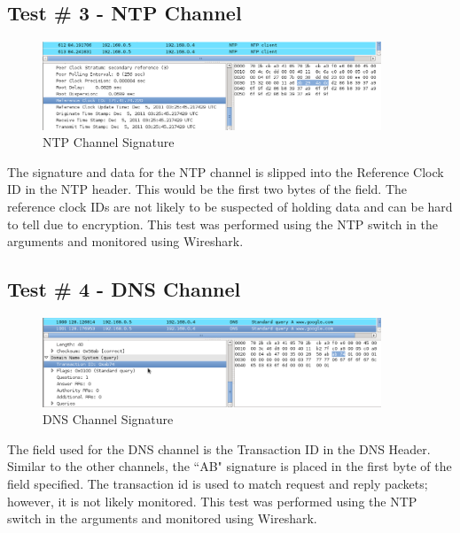 \documentclass[titlepage]{article}
\begin{document}
\clearpage

\subsection{Test \# 3 - NTP Channel}

\begin{figure}[htb]                                                                       
  \begin{center}
    \includegraphics[width=0.9\textwidth]{Pictures/NTP_SIG.png}
  \end{center}
  \caption{NTP Channel Signature}
  \label{fig:ntp_sig}
\end{figure}

The signature and data for the NTP channel is slipped into the Reference Clock ID in the NTP header.
This would be the first two bytes of the field.  The reference clock IDs are not likely to be
suspected of holding data and can be hard to tell due to encryption.
This test was performed using the NTP switch in the arguments and monitored using Wireshark.

\subsection{Test \# 4 - DNS Channel}

\begin{figure}[htb]                                                                       
  \begin{center}
    \includegraphics[width=0.9\textwidth]{Pictures/DNS_SIG.png}
  \end{center}
  \caption{DNS Channel Signature}
  \label{fig:dns_sig}
\end{figure}

The field used for the DNS channel is the Transaction ID in the DNS Header.  Similar to the other channels,
the ``AB" signature is placed in the first byte of the field specified.  The transaction id is used to 
match request and reply packets; however, it is not likely monitored.  This test was performed using the NTP
switch in the arguments and monitored using Wireshark.\\
\end{document}
